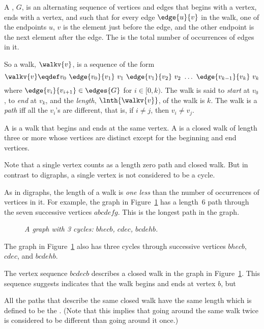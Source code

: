 \begin{definition}\label{def:simplegraph-walks}
A , $G$, is an alternating sequence of
vertices and edges that begins with a vertex, ends with a vertex, and
such that for every edge $\edge{u}{v}$ in the walk, one of the
endpoints $u$, $v$ is the element just before the edge, and the other
endpoint is the next element after the edge.  The  is the total number of occurrences of edges in it.

So a walk, $\walkv{v}$, is a sequence of the form
\[
\walkv{v} \eqdef v_0\ \edge{v_0}{v_1}\
v_1\  \edge{v_1}{v_2}\  v_2\  \dots\  \edge{v_{k-1}}{v_k}\  v_k
\]
where $\edge{v_i}{v_{i+1}} \in \edges{G}$ for $i \in [0,k)$.
  The walk is said to \emph{start} at $v_0$, to \emph{end} at $v_k$,
  and the \emph{length}, $\lnth{\walkv{v}}$, of the walk is
  $k$.  The walk is a \emph{path} iff all the $v_i$'s are different,
  that is, if $i \neq j$, then $v_i \neq v_j$.

A  is a walk that begins and ends at the same
vertex.  A  is a closed walk of length three or more whose
vertices are distinct except for the beginning and end vertices.
\end{definition}
Note that a single vertex counts as a length zero path and closed
walk.  But in contrast to digraphs, a single vertex is not considered
to be a cycle.

As in digraphs, the length of a walk is \emph{one less} than the
number of occurrences of vertices in it.  For example, the graph in
Figure~\ref{dg} has a length~6 path through the seven successive
vertices $abcdefg$.  This is the longest path in the graph.
\begin{figure}
\caption{\em A graph with 3 cycles: $bhecb$,
$cdec$, $bcdehb$.}
\label{dg}
\end{figure}
The graph in Figure~\ref{dg} also has three cycles through successive vertices $bhecb$,
$cdec$, and $bcdehb$.

\iffalse
The vertex sequence $bcdecb$ describes a closed walk in the graph
in Figure~\ref{dg}.  This sequence suggests indicates that the walk
begins and ends at vertex $b$, but

All the paths that describe the same closed walk have the same length
which is defined to be the \term{length of the walk}.  (Note that this
implies that going around the same walk twice is considered to be
different than going around it once.)

